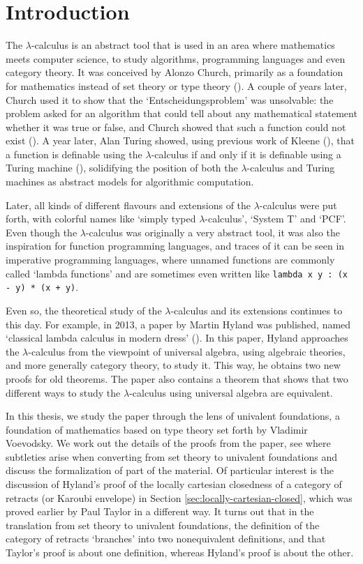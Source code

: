\chapter{Introduction}

The $ \lambda $-calculus is an abstract tool that is used in an area where mathematics meets computer science, to study algorithms, programming languages and even category theory. It was conceived by Alonzo Church, primarily as a foundation for mathematics instead of set theory or type theory (\autocite{church-lambda-calculus}). A couple of years later, Church used it to show that the `Entscheidungsproblem' was unsolvable: the problem asked for an algorithm that could tell about any mathematical statement whether it was true or false, and Church showed that such a function could not exist (\autocite{church-number-theory}). A year later, Alan Turing showed, using previous work of Kleene (\autocite{kleene-lambda}), that a function is definable using the $ \lambda $-calculus if and only if it is definable using a Turing machine (\autocite{turing-lambda}), solidifying the position of both the $ \lambda $-calculus and Turing machines as abstract models for algorithmic computation.

Later, all kinds of different flavours and extensions of the $ \lambda $-calculus were put forth, with colorful names like `simply typed $ \lambda $-calculus', `System T' and `PCF'. Even though the $ \lambda $-calculus was originally a very abstract tool, it was also the inspiration for function programming languages, and traces of it can be seen in imperative programming languages, where unnamed functions are commonly called `lambda functions' and are sometimes even written like \texttt{lambda x y : (x - y) * (x + y)}.

Even so, the theoretical study of the $ \lambda $-calculus and its extensions continues to this day. For example, in 2013, a paper by Martin Hyland was published, named `classical lambda calculus in modern dress' (\autocite{Hyland}). In this paper, Hyland approaches the $ \lambda $-calculus from the viewpoint of universal algebra, using algebraic theories, and more generally category theory, to study it. This way, he obtains two new proofs for old theorems. The paper also contains a theorem that shows that two different ways to study the $ \lambda $-calculus using universal algebra are equivalent.

In this thesis, we study the paper through the lens of univalent foundations, a foundation of mathematics based on type theory set forth by Vladimir Voevodsky. We work out the details of the proofs from the paper, see where subtleties arise when converting from set theory to univalent foundations and discuss the formalization of part of the material. Of particular interest is the discussion of Hyland's proof of the locally cartesian closedness of a category of retracts (or Karoubi envelope) in Section \ref{sec:locally-cartesian-closed}, which was proved earlier by Paul Taylor in a different way. It turns out that in the translation from set theory to univalent foundations, the definition of the category of retracts `branches' into two nonequivalent definitions, and that Taylor's proof is about one definition, whereas Hyland's proof is about the other.

